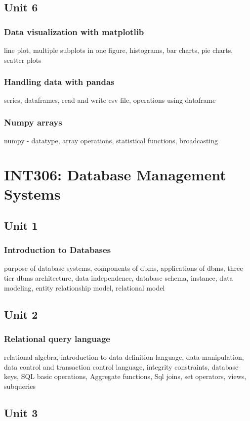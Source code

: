 \documentclass[twocolumn]{article}
\begin{document}
    \subsection*{Unit 6}
    \subsubsection*{Data visualization with matplotlib}
    line plot, multiple subplots in one figure, histograms, bar charts, pie charts, scatter plots
    \subsubsection*{Handling data with pandas}
    series, dataframes, read and write csv file, operations using dataframe
    \subsubsection*{Numpy arrays}
    numpy - datatype, array operations, statistical functions, broadcasting
    \section*{INT306: Database Management Systems}
    \subsection*{Unit 1}
    \subsubsection*{Introduction to Databases}
    purpose of database systems, components of dbms, applications of 
    dbms, three tier dbms architecture, data independence, database schema, instance, data modeling, entity relationship model, relational model
    \subsection*{Unit 2}
    \subsubsection*{Relational query language}
    relational algebra, introduction to data definition language, data manipulation, data control and transaction control language, integrity constraints, database keys, SQL basic operations, Aggregate functions, Sql joins, set operators, views, subqueries
    \subsection*{Unit 3}
\end{document}

